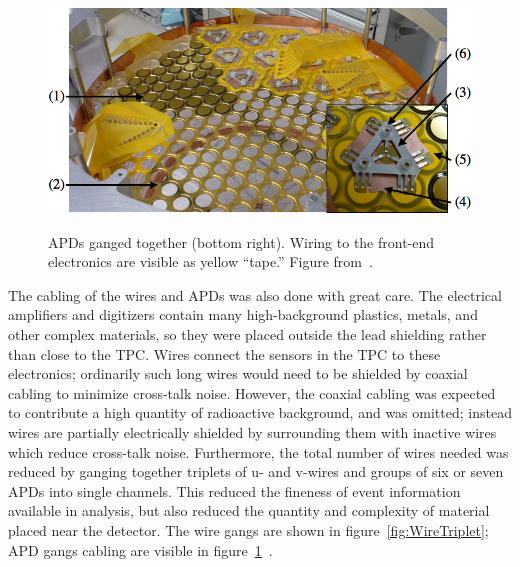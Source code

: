\begin{figure}
\begin{center}
\includegraphics[keepaspectratio=true,width=\textwidth]{PlatterWGO7.png}
\end{center}
\renewcommand{\baselinestretch}{1}
\small\normalsize
\begin{quote}
\caption{APDs ganged together (bottom right).  Wiring to the front-end electronics are visible as yellow ``tape.''  Figure from~\cite{detectorPartI}.}
\label{fig:APDgang}
\end{quote}
\end{figure}
\renewcommand{\baselinestretch}{2}
\small\normalsize

The cabling of the wires and APDs was also done with great care.  The electrical amplifiers and digitizers contain many high-background plastics, metals, and other complex materials, so they were placed outside the lead shielding rather than close to the TPC.  Wires connect the sensors in the TPC to these electronics; ordinarily such long wires would need to be shielded by coaxial cabling to minimize cross-talk noise.  However, the coaxial cabling was expected to contribute a high quantity of radioactive background, and was omitted; instead wires are partially electrically shielded by surrounding them with inactive wires which reduce cross-talk noise.  Furthermore, the total number of wires needed was reduced by ganging together triplets of u- and v-wires and groups of six or seven APDs into single channels. This reduced the fineness of event information available in analysis, but also reduced the quantity and complexity of material placed near the detector.  The wire gangs are shown in figure~\ref{fig:WireTriplet}; APD gangs cabling are visible in figure~\ref{fig:APDgang}~\cite{detectorPartI}.

